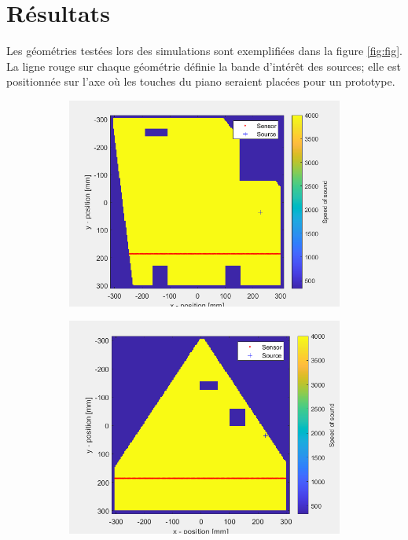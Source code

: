 \documentclass[conference]{IEEEtran}
\begin{document}
\section{Résultats}
Les géométries testées lors des simulations sont exemplifiées dans la figure \ref{fig:fig}. La ligne rouge
sur chaque géométrie définie la bande d'intérêt des sources; elle est positionnée
sur l'axe où les touches du piano seraient placées pour un prototype.
\begin{figure}[H]
  \begin{subfigure}{.155\textwidth}
    \centering
    \includegraphics[width=.95\linewidth]{forme1.png}
    \caption{}
    \label{fig:sfig1}
  \end{subfigure}%
  \begin{subfigure}{.155\textwidth}
    \centering
    \includegraphics[width=.95\linewidth]{forme2.png}

\end{subfigure}
\end{figure}
\end{document}
